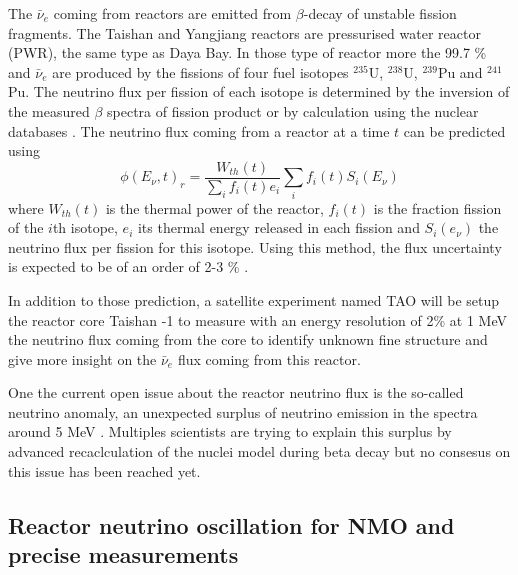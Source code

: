 The $\bar{\nu}_e$ coming from reactors are emitted from $\beta$-decay of unstable fission fragments. The Taishan and Yangjiang reactors are pressurised water reactor (PWR), the same type as Daya Bay. In those type of reactor more the 99.7 \% and $\bar{\nu}_e$ are produced by the fissions of four fuel isotopes $^{235}$U, $^{238}$U, $^{239}$Pu and $^{241}$Pu. The neutrino flux per fission of each isotope is determined by the inversion of the measured $\beta$ spectra of fission product \cite{hahn_antineutrino_1989, mueller_improved_2011, von_feilitzsch_experimental_1982, schreckenbach_determination_1985, huber_determination_2011} or by calculation using the nuclear databases \cite{vogel_reactor_1981, dwyer_spectral_2015}. The neutrino flux coming from a reactor at a time $t$ can be predicted using
\begin{equation}
  \phi(E_\nu, t)_r = \frac{W_{th}(t)}{\sum_i f_i(t) e_i} \sum_i f_i(t) S_i(E_\nu)
\end{equation}
where $W_{th}(t)$ is the thermal power of the reactor, $f_i(t)$ is the fraction fission of the $i$th isotope, $e_i$ its thermal energy released in each fission and $S_i(e_\nu)$ the neutrino flux per fission for this isotope. Using this method, the flux uncertainty is expected to be of an order of 2-3 \% \cite{juno_collaboration_sub-percent_2022}.

In addition to those prediction, a satellite experiment named TAO\cite{juno_collaboration_tao_2020} will be setup the reactor core Taishan -1 to measure with an energy resolution of 2\% at 1 MeV the neutrino flux coming from the core to identify unknown fine structure and give more insight on the $\bar{\nu}_e$ flux coming from this reactor.

One the current open issue about the reactor neutrino flux is the so-called neutrino anomaly, an unexpected surplus of neutrino emission in the spectra around 5 MeV \cite{mention_reactor_2011}.
Multiples scientists are trying to explain this surplus by advanced recaclculation of the nuclei model during beta decay \cite{kopeikin_reevaluating_2021, letourneau_origin_2023} but no consesus on this issue has been reached yet.

\subsection{Reactor neutrino oscillation for NMO and precise measurements}

